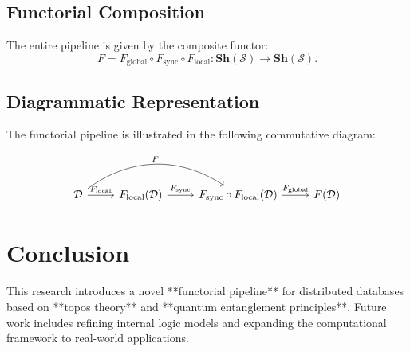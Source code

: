\documentclass[11pt]{article}
\theoremstyle{remark}
\begin{document}
\subsection{Functorial Composition}

The entire pipeline is given by the composite functor:
\[
F = F_{\text{global}} \circ F_{\text{sync}} \circ F_{\text{local}}: \mathbf{Sh}(\mathcal{S}) \to \mathbf{Sh}(\mathcal{S}).
\]

\subsection{Diagrammatic Representation}

The functorial pipeline is illustrated in the following commutative diagram:

\[
\begin{tikzcd}
\mathcal{D} \arrow[r,"F_{\text{local}}"] \arrow[rr, bend left=35, "F"] & F_{\text{local}}(\mathcal{D}) \arrow[r,"F_{\text{sync}}"] & F_{\text{sync}} \circ F_{\text{local}}(\mathcal{D}) \arrow[r,"F_{\text{global}}"] & F(\mathcal{D})
\end{tikzcd}
\]

\section{Conclusion}

This research introduces a novel **functorial pipeline** for distributed databases based on **topos theory** and **quantum entanglement principles**. Future work includes refining internal logic models and expanding the computational framework to real-world applications.
\end{document}
